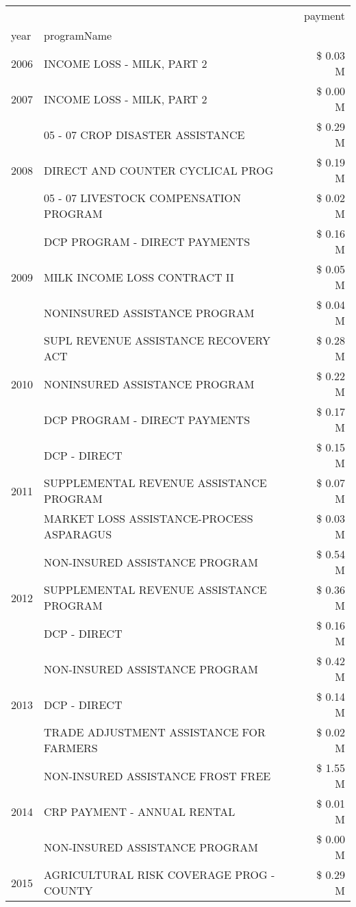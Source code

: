 \begin{tabular}{llr}
\toprule
 &  & payment \\
year & programName &  \\
\midrule
2006 & INCOME LOSS - MILK, PART 2 & \$ 0.03 M \\
\cline{1-3}
2007 & INCOME LOSS - MILK, PART 2 & \$ 0.00 M \\
\cline{1-3}
\multirow[t]{3}{*}{2008} & 05 - 07 CROP DISASTER ASSISTANCE & \$ 0.29 M \\
 & DIRECT AND COUNTER CYCLICAL PROG & \$ 0.19 M \\
 & 05 - 07 LIVESTOCK COMPENSATION PROGRAM & \$ 0.02 M \\
\cline{1-3}
\multirow[t]{3}{*}{2009} & DCP PROGRAM - DIRECT PAYMENTS & \$ 0.16 M \\
 & MILK INCOME LOSS CONTRACT II & \$ 0.05 M \\
 & NONINSURED ASSISTANCE PROGRAM & \$ 0.04 M \\
\cline{1-3}
\multirow[t]{3}{*}{2010} & SUPL REVENUE ASSISTANCE RECOVERY ACT & \$ 0.28 M \\
 & NONINSURED ASSISTANCE PROGRAM & \$ 0.22 M \\
 & DCP PROGRAM - DIRECT PAYMENTS & \$ 0.17 M \\
\cline{1-3}
\multirow[t]{3}{*}{2011} & DCP - DIRECT & \$ 0.15 M \\
 & SUPPLEMENTAL REVENUE ASSISTANCE PROGRAM & \$ 0.07 M \\
 & MARKET LOSS ASSISTANCE-PROCESS ASPARAGUS & \$ 0.03 M \\
\cline{1-3}
\multirow[t]{3}{*}{2012} & NON-INSURED ASSISTANCE PROGRAM & \$ 0.54 M \\
 & SUPPLEMENTAL REVENUE ASSISTANCE PROGRAM & \$ 0.36 M \\
 & DCP - DIRECT & \$ 0.16 M \\
\cline{1-3}
\multirow[t]{3}{*}{2013} & NON-INSURED ASSISTANCE PROGRAM & \$ 0.42 M \\
 & DCP - DIRECT & \$ 0.14 M \\
 & TRADE ADJUSTMENT ASSISTANCE FOR FARMERS & \$ 0.02 M \\
\cline{1-3}
\multirow[t]{3}{*}{2014} & NON-INSURED ASSISTANCE FROST FREE & \$ 1.55 M \\
 & CRP PAYMENT - ANNUAL RENTAL & \$ 0.01 M \\
 & NON-INSURED ASSISTANCE PROGRAM & \$ 0.00 M \\
\cline{1-3}
\multirow[t]{3}{*}{2015} & AGRICULTURAL RISK COVERAGE PROG - COUNTY & \$ 0.29 M \\

\end{tabular}
